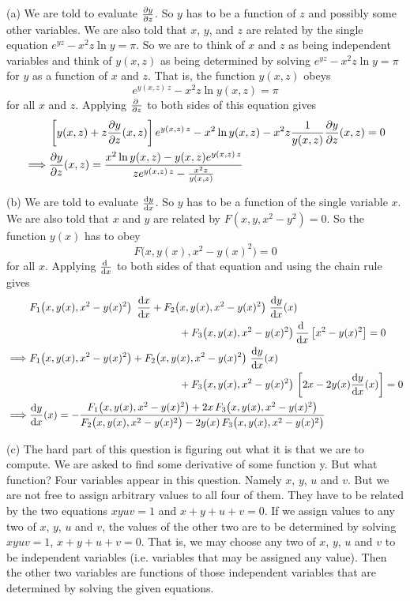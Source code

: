\begin{solution}
(a)
We are told to evaluate $\pdiff{y}{z}$. So $y$ has to be a function of $z$
and possibly some other variables.
We are also told that $x$, $y$, and $z$ are related by the single equation
$e^{yz}-x^2 z \ln y = \pi$.
So we are to think of $x$ and $z$ as being independent variables and think of 
$y(x,z)$ as being determined by solving $e^{yz}-x^2 z \ln y = \pi$ for $y$ as a function of $x$ and $z$. That is, the function $y(x,z)$ obeys
\begin{equation*}
e^{y(x,z)\,z}-x^2 z \ln y(x,z) = \pi
\end{equation*}
for all $x$ and $z$.
Applying 
$\pdiff{}{z}$ to both sides of this equation gives
\begin{align*}
&\left[y(x,z)+z\pdiff{y}{z}(x,z)\right]e^{y(x,z)\,z}-x^2 \ln y(x,z)
-x^2 z\frac{1}{y(x,z)}\pdiff{y}{z}(x,z) = 0\\
\implies & \pdiff{y}{z}(x,z)
=\frac{x^2 \ln y(x,z)-y(x,z)e^{y(x,z)\,z}}{ze^{y(x,z)\,z}-\frac{x^2 z}{y(x,z)}}
\end{align*}

(b) 
We are told to evaluate $\diff{y}{x}$. So $y$ has to be a function of the single variable $x$. We are also told that $x$ and $y$ are related by $F(x,y,x^2-y^2)=0$. So the function $y(x)$ has to obey 
\begin{equation*}
F\big(x,y(x),x^2-y(x)^2\big)=0
\end{equation*}
for all $x$. Applying 
$\diff{}{x}$ to both sides of that equation and using the chain rule gives
\begin{align*}
&F_1\big(x,y(x),x^2-y(x)^2\big)\,\ \diff{x}{x} 
+F_2\big(x,y(x),x^2-y(x)^2\big)\ \diff{y}{x}(x)
\\&\hskip2in
+F_3\big(x,y(x),x^2-y(x)^2\big)\,\diff{}{x}\left[x^2-y(x)^2\right]= 0
\\
\implies &F_1\big(x,y(x),x^2-y(x)^2\big) +F_2\big(x,y(x),x^2-y(x)^2\big)\ \diff{y}{x}(x)
\\&\hskip2in
+F_3\big(x,y(x),x^2-y(x)^2\big)\,\left[2x-2y(x)\diff{y}{x}(x)\right]= 0
\\
\implies & \diff{y}{x}(x)
=-\frac{F_1\big(x,y(x),x^2-y(x)^2\big)+2x\,F_3\big(x,y(x),x^2-y(x)^2\big)}
{F_2\big(x,y(x),x^2-y(x)^2\big)-2y(x)\,F_3\big(x,y(x),x^2-y(x)^2\big)}
\end{align*}

(c) 
The hard part of this question is figuring out what it is that we are to compute. We 
are asked to find some derivative of some function y. But what function? Four variables
appear in this question. Namely  $x$, $y$, $u$ and $v$. But we are not free to assign 
arbitrary values to all four of them. They have to be related by the two equations 
$xyuv=1$ and $x+y+u+v=0$. If we assign values to any two of  $x$, $y$, $u$ and $v$,
the values of the other two are to be determined by solving $xyuv=1$, $x+y+u+v=0$.
That is, we may choose any two of  $x$, $y$, $u$ and $v$ to be independent variables (i.e. 
variables that may be assigned any value). Then the other two variables are functions of those 
independent variables that are determined by solving the given equations.   


\end{solution}
